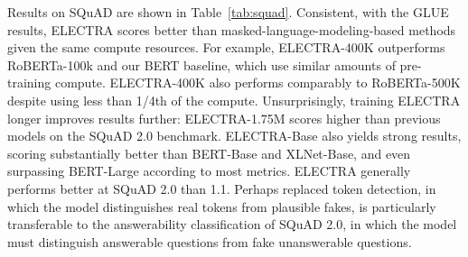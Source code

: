 \documentclass{article}
\begin{document}
Results on SQuAD are shown in Table~\ref{tab:squad}. Consistent, with the GLUE results, ELECTRA scores better than masked-language-modeling-based methods given the same compute resources. 
For example, ELECTRA-400K outperforms RoBERTa-100k and our BERT baseline, which use similar amounts of pre-training compute. 
ELECTRA-400K also performs comparably to RoBERTa-500K despite using less than 1/4th of the compute. 
Unsurprisingly, training ELECTRA longer improves results further: ELECTRA-1.75M scores higher than previous models on the SQuAD 2.0 benchmark. 
ELECTRA-Base also yields strong results, scoring substantially better than BERT-Base and XLNet-Base, and even surpassing  BERT-Large according to most metrics. 
ELECTRA generally performs better at SQuAD 2.0 than 1.1. 
Perhaps replaced token detection, in which the model distinguishes real tokens from plausible fakes, is particularly transferable to the answerability classification of SQuAD 2.0, in which the model must distinguish answerable questions from fake unanswerable questions.
\end{document}
